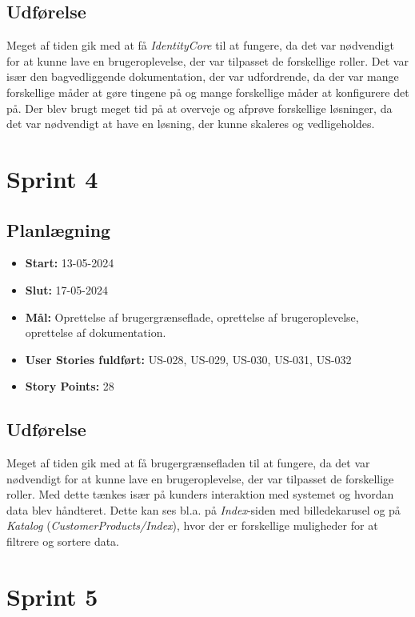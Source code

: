 \subsection{Udførelse}
\label{subsec:sprint-3-udforelse}
Meget af tiden gik med at få \emph{IdentityCore} til at fungere, da det var nødvendigt for at kunne lave en brugeroplevelse, der var tilpasset de forskellige roller.
Det var især den bagvedliggende dokumentation, der var udfordrende, da der var mange forskellige måder at gøre tingene på og mange forskellige måder at konfigurere det på.
Der blev brugt meget tid på at overveje og afprøve forskellige løsninger, da det var nødvendigt at have en løsning, der kunne skaleres og vedligeholdes.

\section{Sprint 4}
\label{sec:sprint-4}
\subsection{Planlægning}
\label{subsec:sprint-4-plan}
\begin{itemize}
    \item \textbf{Start:} 13-05-2024
    \item \textbf{Slut:} 17-05-2024
    \item \textbf{Mål:} Oprettelse af brugergrænseflade, oprettelse af brugeroplevelse, oprettelse af dokumentation.
    \item \textbf{User Stories fuldført:} US-028, US-029, US-030, US-031, US-032
    \item \textbf{Story Points:} 28
\end{itemize}

\subsection{Udførelse}
\label{subsec:sprint-4-udforelse}
Meget af tiden gik med at få brugergrænsefladen til at fungere, da det var nødvendigt for at kunne lave en brugeroplevelse, der var tilpasset de forskellige roller.
Med dette tænkes især på kunders interaktion med systemet og hvordan data blev håndteret. 
Dette kan ses bl.a. på \emph{Index}-siden med billedekarusel og på \emph{Katalog} (\emph{CustomerProducts/Index}), hvor der er forskellige muligheder for at filtrere og sortere data.

\section{Sprint 5}
\label{sec:sprint-5}

